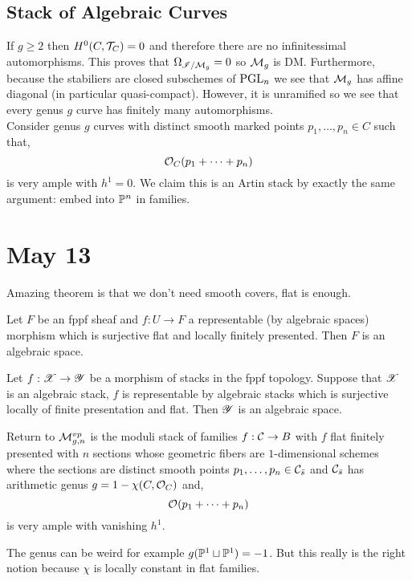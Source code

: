 \documentclass[12pt]{article}
\begin{document}
\subsection{Stack of Algebraic Curves}

If $g \ge 2$ then $H^0(C, \T_C) = 0$ and therefore there are no infinitessimal automorphisms. This proves that $\Omega_{\I / \M_g} = 0$ so $\M_g$ is DM. Furthermore, because the stabiliers are closed subschemes of $\PGL_n$ we see that $\M_g$ has affine diagonal (in particular quasi-compact). However, it is unramified so we see that every genus $g$ curve has finitely many automorphisms. 
\bigskip\\
Consider genus $g$ curves with distinct smooth marked points $p_1, \dots, p_n \in C$ such that,
\[ \struct{C}(p_1 + \cdots + p_n) \]
is very ample with $h^1 = 0$. We claim this is an Artin stack by exactly the same argument: embed into $\P^n$ in families. 

\section{May 13}

\begin{rmk}
Amazing theorem is that we don't need smooth covers, flat is enough.
\end{rmk}

\begin{theorem}[04S6]
Let $F$ be an fppf sheaf and $f : U \to F$ a representable (by algebraic spaces) morphism which is surjective flat and locally finitely presented. Then $F$ is an algebraic space.
\end{theorem}

\begin{theorem}[06DC]
Let $f : \X \to \Y$ be a morphism of stacks in the fppf topology. Suppose that $\X$ is an algebraic stack, $f$ is representable by algebraic stacks which is surjective locally of finite presentation and flat. Then $\Y$ is an algebraic space. 
\end{theorem}

Return to $\M^{vp}_{g,n}$ is the moduli stack of families $f : \C \to B$ with $f$ flat finitely presented with $n$ sections whose geometric fibers are $1$-dimensional schemes where the sections are distinct smooth points $p_1, \dots, p_n \in \C_{\bar{s}}$ and $\C_{\bar{s}}$ has arithmetic genus $g = 1 - \chi(C, \struct{C})$ and,
\[ \struct{}(p_1 + \cdots + p_n) \]
is very ample with vanishing $h^1$. 

\begin{rmk}
The genus can be weird for example $g(\P^1 \sqcup \P^1) = -1$. But this really is the right notion because $\chi$ is locally constant in flat families. 
\end{rmk}
\end{document}
